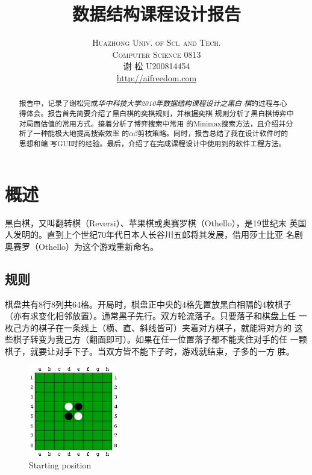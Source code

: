 \documentclass[oneside,a4paper]{article}
\begin{document}
\author{\textsc{Huazhong Univ. of Sci. and Tech.} \\\textsc{Computer
    Science} 0813\\\textsc{谢
    松} U200814454\\\href{http://aifreedom.com}{http://aifreedom.com}}

\title{数据结构课程设计报告}

\maketitle

\begin{abstract}
  报告中，记录了谢松完成\emph{华中科技大学2010年数据结构课程设计之黑白
    棋}的过程与心得体会。报告首先简要介绍了黑白棋的奕棋规则，并根据奕棋
  规则分析了黑白棋博弈中对局面估值的常用方式。接着分析了博弈搜索中常用
  的Minimax搜索方法，且介绍并分析了一种能极大地提高搜索效率
  的$\alpha\beta$剪枝策略。同时，报告总结了我在设计软件时的思想和编
  写GUI时的经验。最后，介绍了在完成课程设计中使用到的软件工程方法。
\end{abstract}
\section{概述}
\label{sec:general}

黑白棋，又叫翻转棋（Reversi）、苹果棋或奥赛罗棋（Othello），是19世纪末
英国人发明的。直到上个世纪70年代日本人长谷川五郎将其发展，借用莎士比亚
名剧奥赛罗（Othello）为这个游戏重新命名。

\subsection{规则}
\label{sec:rules}

棋盘共有8行8列共64格。开局时，棋盘正中央的4格先置放黑白相隔的4枚棋子
（亦有求变化相邻放置）。通常黑子先行。双方轮流落子。只要落子和棋盘上任
一枚己方的棋子在一条线上（横、直、斜线皆可）夹着对方棋子，就能将对方的
这些棋子转变为我己方（翻面即可）。如果在任一位置落子都不能夹住对手的任
一颗棋子，就要让对手下子。当双方皆不能下子时，游戏就结束，子多的一方
胜。

\begin{figure}[!h]
  \centering
  \includegraphics[height=4cm]{starting.png}
  \caption{Starting position}
  \label{fig:starting}
\end{figure}
\end{document}
